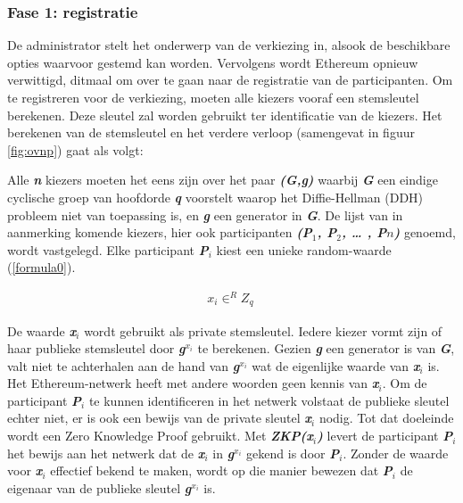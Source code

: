 		\subsubsection*{Fase 1: registratie }
			De administrator stelt het onderwerp van de verkiezing in, alsook de beschikbare opties waarvoor gestemd kan worden. Vervolgens wordt Ethereum opnieuw verwittigd, ditmaal om over te gaan naar de registratie van de participanten. Om te registreren voor de verkiezing, moeten alle kiezers vooraf een stemsleutel berekenen. Deze sleutel zal worden gebruikt ter identificatie van de kiezers. Het berekenen van de stemsleutel en het verdere verloop (samengevat in figuur \ref{fig:ovnp}) gaat als volgt: 
			
			Alle \textbf{\textit{n}} kiezers moeten het eens zijn over het paar \textbf{\textit{(G,g)}} waarbij \textbf{\textit{G}} een eindige cyclische groep van hoofdorde \textbf{\textit{q}} voorstelt waarop het Diffie-Hellman (DDH) probleem niet van toepassing is, en \textbf{\textit{g}} een generator in \textbf{\textit{G}}. De lijst van in aanmerking komende kiezers, hier ook participanten \textbf{\textit{(P$_{1}$, P$_{2}$, … , P${n}$)}} genoemd, wordt vastgelegd. Elke participant \textbf{\textit{P$_{i}$}} kiest een unieke random-waarde (\ref{formula0}).
			
			\begin{ceqn}
				\begin{align}
				x_{i} \in^{R} Z_{q}\label{formula0}\
				\end{align}
			\end{ceqn}	
			
			 De waarde \textbf{\textit{x$_{i}$}} wordt gebruikt als private stemsleutel. Iedere kiezer vormt zijn of haar publieke stemsleutel door \textbf{\textit{g$^{x_{i}}$}} te berekenen. Gezien \textbf{\textit{g}} een generator is van \textbf{\textit{G}}, valt niet te achterhalen aan de hand van \textbf{\textit{g$^{x_{i}}$}} wat de eigenlijke waarde van \textbf{\textit{x$_{i}$}} is. Het Ethereum-netwerk heeft met andere woorden geen kennis van \textbf{\textit{x$_{i}$}}. Om de participant \textbf{\textit{P$_{i}$}} te kunnen identificeren in het netwerk volstaat de publieke sleutel echter niet, er is ook een bewijs van de private sleutel \textbf{\textit{x$_{i}$}} nodig. Tot dat doeleinde wordt een Zero Knowledge Proof gebruikt. Met \textbf{\textit{ZKP(x$_{i}$)}} levert de participant \textbf{\textit{P$_{i}$}}  het bewijs aan het netwerk dat de \textbf{\textit{x$_{i}$}}  in \textbf{\textit{g$^{x_{i}}$}} gekend is door \textbf{\textit{P$_{i}$}}. Zonder de waarde voor \textbf{\textit{x$_{i}$}}  effectief bekend te maken, wordt op die manier bewezen dat \textbf{\textit{P$_{i}$}} de eigenaar van de publieke sleutel \textbf{\textit{g$^{x_{i}}$}} is.
			
